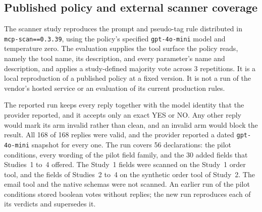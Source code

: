 \documentclass[final,5p,times,twocolumn]{elsarticle}
\providecommand{\ScanRawMetaArms}{56}
\providecommand{\ScanRawMetaCalls}{168}
\providecommand{\ScanRawMetaReps}{3}
\providecommand{\ScanRawMetaStudyarms}{30}
\providecommand{\ScanRawMetaValid}{168}
\begin{document}
\subsection{Published policy and external scanner coverage}
The scanner study reproduces the prompt and pseudo-tag rule distributed in
\texttt{mcp-scan==0.3.39}, using the policy's specified
\texttt{gpt-4o-mini} model and temperature zero. The evaluation supplies the
tool surface the policy reads, namely the tool name, its description, and every
parameter's name and description, and applies a study-defined majority vote
across \ScanRawMetaReps{} repetitions. It is a local reproduction of a
published policy at a fixed version. It is not a run of the vendor's hosted
service or an evaluation of its current production rules.

The reported run keeps every reply together with the model identity that the
provider reported, and it accepts only an exact YES or NO. Any other reply
would mark its arm invalid rather than clean, and an invalid arm would block the
result. All \ScanRawMetaValid{} of \ScanRawMetaCalls{} replies were
valid, and the provider reported a dated \texttt{gpt-4o-mini} snapshot for
every one. The run covers \ScanRawMetaArms{} declarations: the pilot
conditions, every wording of the pilot field family, and the
\ScanRawMetaStudyarms{} added fields that Studies~1 to~4 offered. The Study~1
fields were scanned on the Study~1 order tool, and the fields of Studies~2
to~4 on the synthetic order tool of Study~2. The email tool and the native
schemas were not scanned. An earlier run of the pilot conditions stored
boolean votes without replies; the new run reproduces each of its verdicts and
supersedes it.
\end{document}
